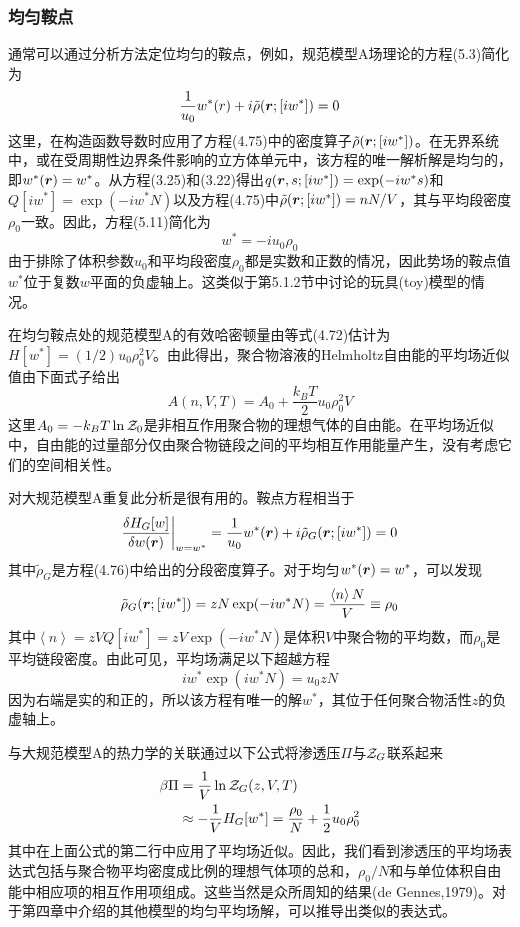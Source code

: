 \subsubsection{均匀鞍点}
通常可以通过分析方法定位均匀的鞍点，例如，规范模型A场理论的方程(5.3)简化为
\begin{equation}
\frac{1}{u_0}w^*(r)+i\tilde{\rho}(\bm{r};[iw^*])=0
\end{equation}
这里，在构造函数导数时应用了方程(4.75)中的密度算子$\tilde{\rho}(\bm{r};[iw^*])$。在无界系统中，或在受周期性边界条件影响的立方体单元中，该方程的唯一解析解是均匀的，即$w^*(\bm{r})=w^*$。从方程(3.25)和(3.22)得出$q(\bm{r},s;[iw^*])=\exp(-iw^*s)$和$Q[iw^*]=\exp(-iw^*N)$以及方程(4.75)中$\tilde{\rho}(\bm{r};[iw^*])=nN/V$，其与平均段密度$\rho_0$一致。因此，方程(5.11)简化为
\begin{equation}
w^*=-iu_0\rho_0
\end{equation}
由于排除了体积参数$u_0$和平均段密度$\rho_0$都是实数和正数的情况，因此势场的鞍点值$w^*$位于复数$w$平面的负虚轴上。这类似于第5.1.2节中讨论的玩具(toy)模型的情况。

在均匀鞍点处的规范模型A的有效哈密顿量由等式(4.72)估计为$H[w^*]=(1/2)u_0\rho_0^2V$。由此得出，聚合物溶液的Helmholtz自由能的平均场近似值由下面式子给出
\begin{equation}
A(n,V,T)=A_0+\frac{k_BT}{2}u_0\rho_0^2V
\end{equation}
这里$A_0=-k_BT\ln\mathcal{Z}_0$是非相互作用聚合物的理想气体的自由能。在平均场近似中，自由能的过量部分仅由聚合物链段之间的平均相互作用能量产生，没有考虑它们的空间相关性。

对大规范模型A重复此分析是很有用的。鞍点方程相当于
\begin{equation}
\frac{\delta H_G[w]}{\delta w(\bm{r})}\bigg|_{w=w^*}=\frac{1}{u_0}w^*(\bm{r})+i\tilde{\rho}_G(\bm{r};[iw^*])=0
\end{equation}
其中$\tilde{\rho}_G$是方程(4.76)中给出的分段密度算子。对于均匀$w^*(\bm{r})=w^*$，可以发现
\begin{equation}
\tilde{\rho}_G(\bm{r};[iw^*])=zN\exp(-iw^*N)=\frac{\left\langle n\right\rangle N}{V}\equiv\rho_0
\end{equation}
其中$\left\langle n\right\rangle=zVQ[iw^*]=zV\exp(-iw^*N)$是体积$V$中聚合物的平均数，而$\rho_0$是平均链段密度。由此可见，平均场满足以下超越方程
\begin{equation}
iw^*\exp(iw^*N)=u_0zN
\end{equation}
因为右端是实的和正的，所以该方程有唯一的解$w^*$，其位于任何聚合物活性$z$的负虚轴上。

与大规范模型A的热力学的关联通过以下公式将渗透压$\Pi$与$\mathcal{Z}_G$联系起来
\begin{equation}
\begin{aligned}
\beta\Pi&=\frac{1}{V}\ln\mathcal{Z}_G(z,V,T)\\
&\approx-\frac{1}{V}H_G[w^*]=\frac{\rho_0}{N}+\frac{1}{2}u_0\rho_0^2
\end{aligned}
\end{equation}
其中在上面公式的第二行中应用了平均场近似。因此，我们看到渗透压的平均场表达式包括与聚合物平均密度成比例的理想气体项的总和，$\rho_0/N$和与单位体积自由能中相应项的相互作用项组成。这些当然是众所周知的结果(de Gennes,1979)。对于第四章中介绍的其他模型的均匀平均场解，可以推导出类似的表达式。
